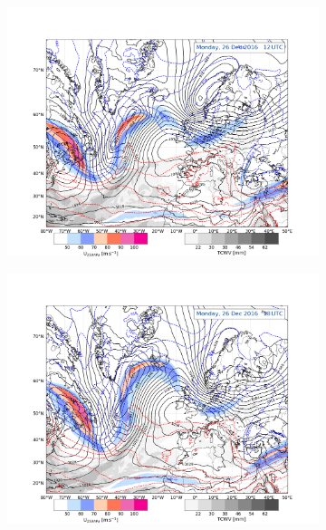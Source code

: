 \begin{figure}
	\begin{subfigure}[b]{0.49\textwidth}
		\includegraphics[trim={4.2cm 0cm 4.3cm 5.1cm},clip,
		width=\textwidth]{./fig_Geopot_Jet/20161226_12}
		\caption{} \label{fig:GP26}
	\end{subfigure}
	\begin{subfigure}[b]{0.49\textwidth}
		\includegraphics[trim={4.2cm 0cm 4.3cm 5.1cm},clip,
		width=\textwidth]{./fig_Geopot_Jet/20161226_18}
		\caption{} \label{fig:GP26_18}
	\end{subfigure}
	\begin{subfigure}[b]{0.49\textwidth}

\end{subfigure}
\end{figure}
